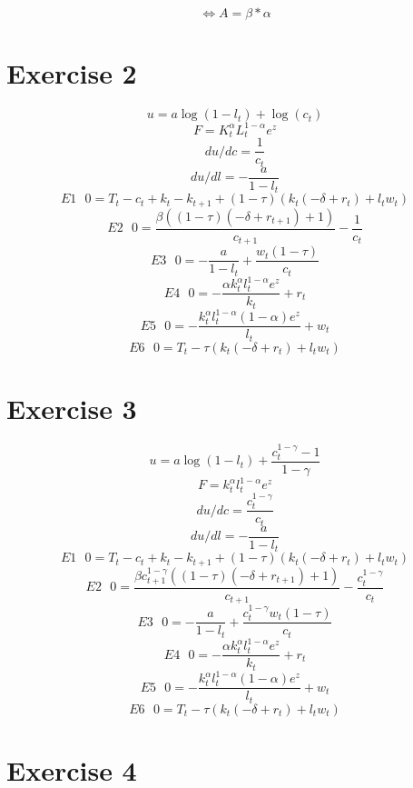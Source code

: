 \documentclass[a4paper]{article}
\begin{document}
$$ \iff A=  \beta*\alpha $$

\section*{Exercise 2}

$$ u = a \log{\left(1 - l_{t} \right)} + \log{\left(c_{t} \right)} $$
$$ F =  K_{t}^{\alpha} L_{t}^{1 - \alpha} e^{z} $$
$$ du/dc =  \frac{1}{c_{t}} $$
$$ du/dl =  - \frac{a}{1 - l_{t}} $$
$$ E1 \text{  }
 0 =  T_{t} - c_{t} + k_{t} - k_{t+1} + \left(1 - \tau\right) \left(k_{t} \left(- \delta + r_{t}\right) + l_{t} w_{t}\right) $$
$$ E2 \text{  }
 0 =  \frac{\beta \left(\left(1 - \tau\right) \left(- \delta + r_{t+1}\right) + 1\right)}{c_{t+1}} - \frac{1}{c_{t}} $$
$$ E3 \text{  }
 0 =  - \frac{a}{1 - l_{t}} + \frac{w_{t} \left(1 - \tau\right)}{c_{t}} $$
$$ E4 \text{  }
 0 =  - \frac{\alpha k_{t}^{\alpha} l_{t}^{1 - \alpha} e^{z}}{k_{t}} + r_{t} $$
$$ E5 \text{  }
 0 =  - \frac{k_{t}^{\alpha} l_{t}^{1 - \alpha} \left(1 - \alpha\right) e^{z}}{l_{t}} + w_{t} $$
$$ E6 \text{  }
 0 =  T_{t} - \tau \left(k_{t} \left(- \delta + r_{t}\right) + l_{t} w_{t}\right) $$


\section*{Exercise 3}

$$ u =  a \log{\left(1 - l_{t} \right)} + \frac{c_{t}^{1 - \gamma} - 1}{1 - \gamma} $$
$$ F =  k_{t}^{\alpha} l_{t}^{1 - \alpha} e^{z} $$
$$ du/dc =  \frac{c_{t}^{1 - \gamma}}{c_{t}} $$
$$ du/dl =  - \frac{a}{1 - l_{t}} $$
$$ E1 \text{  }
 0 =  T_{t} - c_{t} + k_{t} - k_{t+1} + \left(1 - \tau\right) \left(k_{t} \left(- \delta + r_{t}\right) + l_{t} w_{t}\right) $$
$$ E2 \text{  }
 0 =  \frac{\beta c_{t+1}^{1 - \gamma} \left(\left(1 - \tau\right) \left(- \delta + r_{t+1}\right) + 1\right)}{c_{t+1}} - \frac{c_{t}^{1 - \gamma}}{c_{t}} $$
$$ E3 \text{  }
 0 =  - \frac{a}{1 - l_{t}} + \frac{c_{t}^{1 - \gamma} w_{t} \left(1 - \tau\right)}{c_{t}} $$
$$ E4 \text{  }
 0 =  - \frac{\alpha k_{t}^{\alpha} l_{t}^{1 - \alpha} e^{z}}{k_{t}} + r_{t} $$
$$ E5 \text{  }
 0 =  - \frac{k_{t}^{\alpha} l_{t}^{1 - \alpha} \left(1 - \alpha\right) e^{z}}{l_{t}} + w_{t} $$
$$ E6 \text{  }
 0 =  T_{t} - \tau \left(k_{t} \left(- \delta + r_{t}\right) + l_{t} w_{t}\right) $$

\section*{Exercise 4}
\end{document}
